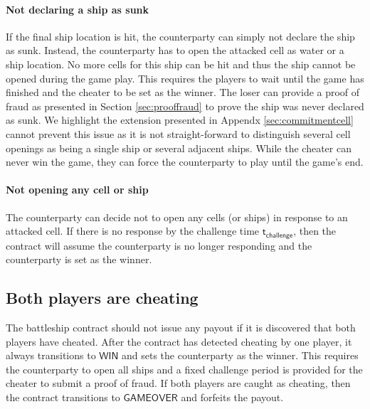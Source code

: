 \documentclass{llncs}
\newcommand{\gamewinner}{\mathsf{WIN}}
\newcommand{\gamefinished}{\mathsf{GAMEOVER}}
\newcommand{\timechallenge}{\mathsf{t}_{\mathsf{challenge}}}
\begin{document}
	\paragraph{Not declaring a ship as sunk}
	If the final ship location is hit, the counterparty can simply not declare the ship as sunk.
	Instead, the counterparty has to open the attacked cell as water or a ship location.
	No more cells for this ship can be hit and thus the ship cannot be opened during the game play. 
	This requires the players to wait until the game has finished and the cheater to be set as the winner. 
	The loser can provide a proof of fraud as presented in Section \ref{sec:prooffraud} to prove the ship was never declared as sunk. 
	We highlight the extension presented in Appendx \ref{sec:commitmentcell} cannot prevent this issue as it is not straight-forward to distinguish several cell openings as being a single ship or several adjacent ships.
	While the cheater can never win the game,  they can force the counterparty to play until the game's end. 
	
	\paragraph{Not opening any cell or ship}
	The counterparty can decide not to open any cells (or ships) in response to an attacked cell. If there is no response by the challenge time $\timechallenge$, then the contract will assume the counterparty is no longer responding and the counterparty is set as the winner. 
	
	\subsection{Both players are cheating} 
	
	The battleship contract should not issue any payout if it is discovered that both players have cheated. 
	After the contract has detected cheating by one player, it always transitions to $\gamewinner$ and sets the counterparty as the winner.
	This requires the counterparty to open all ships and a fixed challenge period is provided for the cheater to submit a proof of fraud.
	If both players are caught as cheating, then the contract transitions to $\gamefinished$ and forfeits the payout. 
	
\end{document}
